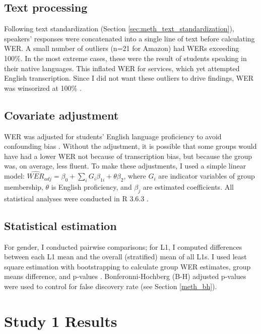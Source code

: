 \documentclass [PhD] {uclathes}
\begin{document}
\subsection{Text processing}

Following text standardization (Section \ref{sec:meth_text_standardization}), speakers' responses were concatenated into a single line of text before calculating WER. A small number of outliers (n=21 for Amazon) had WERs exceeding 100\%. In the most extreme cases, these were the result of students speaking in their native languages. This inflated WER for services, which yet attempted English transcription. Since I did not want these outliers to drive findings, WER was winsorized at 100\% \cite{wilcox2012}.

\subsection{Covariate adjustment}
\label{sec:meth_cov}

WER was adjusted for students' English language proficiency to avoid confounding bias \citep{elwert2014}. Without the adjustment, it is possible that some groups would have had a lower WER not because of transcription bias, but because the group was, on average, less fluent. To make these adjustments, I used a simple linear model: ${\widehat{WER}}_{adj} = \beta_0 + {\textstyle\sum}_{i}G_i\beta_{1i} + \theta\beta_2$, where $G_i$ are indicator variables of group membership, $\theta$ is English proficiency, and $\beta_j$ are estimated coefficients. All statistical analyses were conducted in R 3.6.3 \citep{r2020}.

\subsection{Statistical estimation}

For gender, I conducted pairwise comparisons; for L1, I computed differences between each L1 mean and the overall (stratified) mean of all L1s. I used least square estimation with bootstrapping to calculate group WER estimates, group means difference, and p-values \citep{tibshirani1993}. Bonferonni-Hochberg (B-H) adjusted p-values were used to control for false discovery rate (see Section \ref{meth_bh}).

\section{Study 1 Results}
\end{document}
